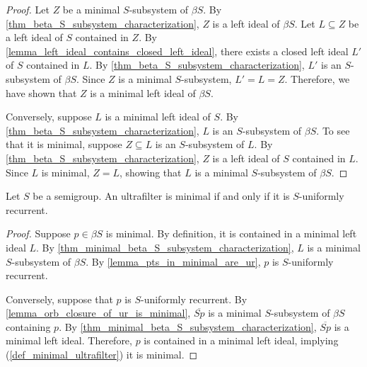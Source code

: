 \begin{proof}
\leanok{}
    Let $Z$ be a minimal $S$-subsystem of $\beta S$.  By \cref{thm_beta_S_subsystem_characterization}, $Z$ is a left ideal of $\beta S$.  Let $L \subseteq Z$ be a left ideal of $S$ contained in $Z$.  By \cref{lemma_left_ideal_contains_closed_left_ideal}, there exists a closed left ideal $L'$ of $S$ contained in $L$.  By \cref{thm_beta_S_subsystem_characterization}, $L'$ is an $S$-subsystem of $\beta S$.  Since $Z$ is a minimal $S$-subsystem, $L' = L = Z$.  Therefore, we have shown that $Z$ is a minimal left ideal of $\beta S$.

    Conversely, suppose $L$ is a minimal left ideal of $S$. By \cref{thm_beta_S_subsystem_characterization}, $L$ is an $S$-subsystem of $\beta S$.  To see that it is minimal, suppose $Z \subseteq L$ is an $S$-subsystem of $L$. By \cref{thm_beta_S_subsystem_characterization}, $Z$ is a left ideal of $S$ contained in $L$.  Since $L$ is minimal, $Z = L$, showing that $L$ is a minimal $S$-subsystem of $\beta S$.
\end{proof}

\begin{theorem}
\label{thm_minimal_ultrafilter_iff_unif_rec}
\leanok{}
    Let $S$ be a semigroup.  An ultrafilter is minimal if and only if it is $S$-uniformly recurrent.
\end{theorem}

\begin{proof}
\leanok{}
    Suppose $p \in \beta S$ is minimal.  By definition, it is contained in a minimal left ideal $L$.  By \cref{thm_minimal_beta_S_subsystem_characterization}, $L$ is a minimal $S$-subsystem of $\beta S$. By \cref{lemma_pts_in_minimal_are_ur}, $p$ is $S$-uniformly recurrent.

    Conversely, suppose that $p$ is $S$-uniformly recurrent.  By \cref{lemma_orb_closure_of_ur_is_minimal}, $\overline{Sp}$ is a minimal $S$-subsystem of $\beta S$ containing $p$. By \cref{thm_minimal_beta_S_subsystem_characterization}, $\overline{Sp}$ is a minimal left ideal.  Therefore, $p$ is contained in a minimal left ideal, implying (\cref{def_minimal_ultrafilter}) it is minimal.
\end{proof}

